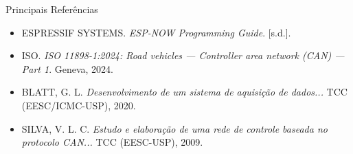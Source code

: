 \begin{frame}{Principais Referências}
    \footnotesize
    \begin{itemize}
        \item ESPRESSIF SYSTEMS. \textit{ESP-NOW Programming Guide}. [s.d.].
        \item ISO. \textit{ISO 11898-1:2024: Road vehicles — Controller area network (CAN) — Part 1}. Geneva, 2024.
        \item BLATT, G. L. \textit{Desenvolvimento de um sistema de aquisição de dados...} TCC (EESC/ICMC-USP), 2020.
        \item SILVA, V. L. C. \textit{Estudo e elaboração de uma rede de controle baseada no protocolo CAN...} TCC (EESC-USP), 2009.
    \end{itemize}
\end{frame}
